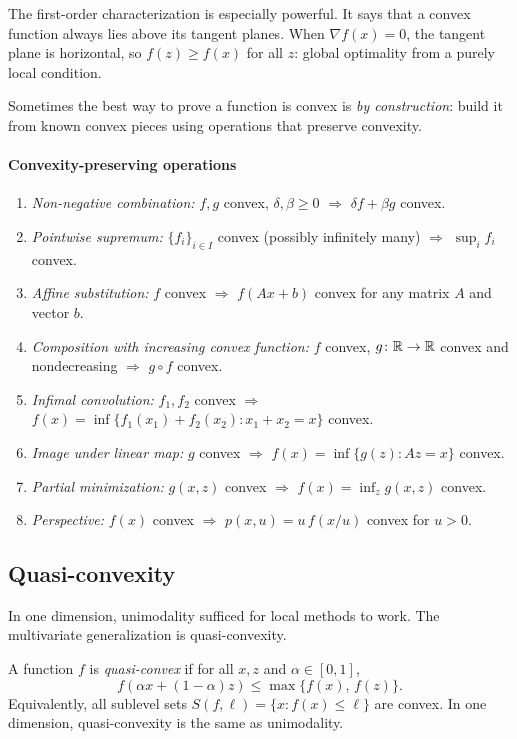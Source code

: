 The first-order characterization is especially powerful.
It says that a convex function always lies above its tangent planes.
When $\nabla f(x) = 0$, the tangent plane is horizontal, so $f(z) \geq f(x)$ for all $z$: global optimality from a purely local condition.

Sometimes the best way to prove a function is convex is \emph{by construction}: build it from known convex pieces using operations that preserve convexity.

\paragraph{Convexity-preserving operations}

\begin{enumerate}
	\item \textit{Non-negative combination:} $f, g$ convex, $\delta, \beta \geq 0$ $\Rightarrow$ $\delta f + \beta g$ convex.
	\item \textit{Pointwise supremum:} $\{f_i\}_{i \in I}$ convex (possibly infinitely many) $\Rightarrow$ $\sup_i f_i$ convex.
	\item \textit{Affine substitution:} $f$ convex $\Rightarrow$ $f(Ax + b)$ convex for any matrix $A$ and vector $b$.
	\item \textit{Composition with increasing convex function:} $f$ convex, $g \colon \mathbb{R} \to \mathbb{R}$ convex and nondecreasing $\Rightarrow$ $g \circ f$ convex.
	\item \textit{Infimal convolution:} $f_1, f_2$ convex $\Rightarrow$ $f(x) = \inf\{f_1(x_1) + f_2(x_2) : x_1 + x_2 = x\}$ convex.
	\item \textit{Image under linear map:} $g$ convex $\Rightarrow$ $f(x) = \inf\{g(z) : Az = x\}$ convex.
	\item \textit{Partial minimization:} $g(x, z)$ convex $\Rightarrow$ $f(x) = \inf_z g(x, z)$ convex.
	\item \textit{Perspective:} $f(x)$ convex $\Rightarrow$ $p(x, u) = u\, f(x/u)$ convex for $u > 0$.
\end{enumerate}


\subsection{Quasi-convexity}\label{sec:quasiconvex}

In one dimension, unimodality sufficed for local methods to work.
The multivariate generalization is quasi-convexity.

\begin{definition}\label{def:quasiconvex}
	A function $f$ is \emph{quasi-convex} if for all $x, z$ and $\alpha \in [0,1]$,
	\begin{equation}\label{eq:quasiconvexity}
		f(\alpha x + (1 - \alpha) z) \leq \max\{f(x),\, f(z)\}.
	\end{equation}
	Equivalently, all sublevel sets $S(f, \ell) = \{x : f(x) \leq \ell\}$ are convex.
	In one dimension, quasi-convexity is the same as unimodality.
\end{definition}

